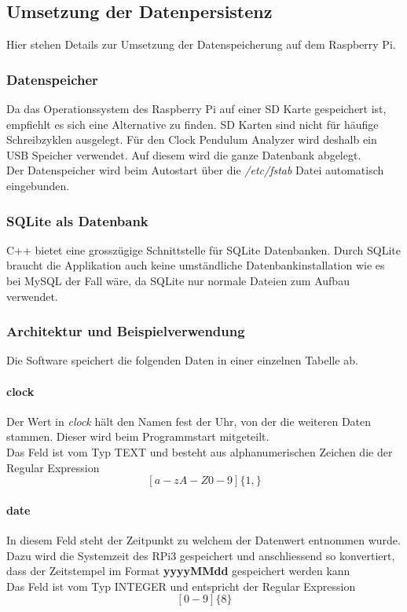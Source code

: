 \subsection{Umsetzung der Datenpersistenz}
    Hier stehen Details zur Umsetzung der Datenspeicherung auf dem Raspberry Pi.
    \subsubsection{Datenspeicher}
    Da das Operationssystem des Raspberry Pi auf einer SD Karte gespeichert ist, empfiehlt es sich eine Alternative zu finden. SD Karten sind nicht für häufige Schreibzyklen ausgelegt. Für den Clock Pendulum Analyzer wird deshalb ein USB Speicher verwendet. Auf diesem wird die ganze Datenbank abgelegt.\\
    Der Datenspeicher wird beim Autostart über die \textit{/etc/fstab} Datei automatisch eingebunden.
    
    \subsubsection{SQLite als Datenbank}
    C++ bietet eine grosszügige Schnittstelle für SQLite Datenbanken. Durch SQLite braucht die Applikation auch keine umständliche Datenbankinstallation wie es bei MySQL der Fall wäre, da SQLite nur normale Dateien zum Aufbau verwendet.
    
    \subsubsection{Architektur und Beispielverwendung}
    Die Software speichert die folgenden Daten in einer einzelnen Tabelle ab.
    \paragraph{clock}
    Der Wert in \textit{clock} hält den Namen fest der Uhr, von der die weiteren Daten stammen. Dieser wird beim Programmstart mitgeteilt.\\
    Das Feld ist vom Typ TEXT und besteht aus alphanumerischen Zeichen die der Regular Expression $$[a-zA-Z0-9]\{1,\}$$
    \paragraph{date}
    In diesem Feld steht der Zeitpunkt zu welchem der Datenwert entnommen wurde. Dazu wird die Systemzeit des RPi3 gespeichert und anschliessend so konvertiert, dass der Zeitstempel im Format \textbf{yyyyMMdd} gespeichert werden kann\\
    Das Feld ist vom Typ INTEGER und entspricht der Regular Expression
    $$[0-9]\{8\}$$
